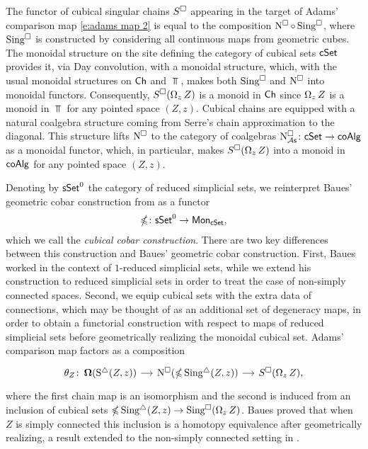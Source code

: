 The functor of cubical singular chains $S^\square$ appearing in the target of Adams' comparison map \eqref{e:adams map 2} is equal to the composition $\operatorname{N^{\square}} \circ \operatorname{Sing^{\square}}$, where $\operatorname{Sing^{\square}}$ is constructed by considering all continuous maps from geometric cubes.
The monoidal structure on the site defining the category of cubical sets $\mathsf{cSet}$ provides it, via Day convolution, with a monoidal structure, which, with the usual monoidal structures on $\mathsf{Ch}$ and $\Top$, makes both $\operatorname{Sing^{\square}}$ and $\operatorname{N^{\square}}$ into monoidal functors.
Consequently, $S^\square(\operatorname{\Omega}_z Z)$ is a monoid in $\mathsf{Ch}$ since $\operatorname{\Omega}_z Z$ is a monoid in $\Top$ for any pointed space $(Z, z)$.
Cubical chains are equipped with a natural coalgebra structure coming from Serre's chain approximation to the diagonal.
This structure lifts $\operatorname{N^{\square}}$ to the category of coalgebras $\operatorname{N^{\square}_{{\mathcal{A}\mathsf{s}}}} \colon \mathsf{cSet} \to \mathsf{coAlg}$ as a monoidal functor, which, in particular, makes $S^\square(\operatorname{\Omega}_z Z)$ into a monoid in $\mathsf{coAlg}$ for any pointed space $(Z, z)$.

Denoting by $\mathsf{sSet}^0$ the category of reduced simplicial sets, we reinterpret Baues' geometric cobar construction from \cite{baues1998hopf} as a functor
\[
\operatorname{\mathbb{\Omega}} \colon \mathsf{sSet}^0 \to \mathsf{Mon}_{\mathsf{cSet}},
\]
which we call the \textit{cubical cobar construction}. There are two key differences between this construction and Baues' geometric cobar construction. First, Baues worked in the context of $1$-reduced simplicial sets, while we extend his construction to reduced simplicial sets in order to treat the case of non-simply connected spaces. Second, we equip cubical sets with the extra data of connections, which may be thought of as an additional set of degeneracy maps, in order to obtain a functorial construction with respect to maps of reduced simplicial sets before geometrically realizing the monoidal cubical set. Adams' comparison map factors as a composition
\begin{equation} \label{e:baues factorization of adams map}
\begin{tikzcd}[column sep = small]
\theta_Z \colon \cobar(\sS(Z, z)) \arrow[r] &
\cchains(\ccobar \sSing(Z, z)) \arrow[r] &
S^{\cube}(\loops_z Z),
\end{tikzcd}
\end{equation}
where the first chain map is an isomorphism and the second is induced from an inclusion of cubical sets $\operatorname{\mathbb{\Omega}} \operatorname{Sing^{\triangle}}(Z, z) \to \operatorname{Sing^{\square}}(\operatorname{\Omega}_z Z)$.
Baues proved that when $Z$ is simply connected this inclusion is a homotopy equivalence after geometrically realizing, a result extended to the non-simply connected setting in \cite{rivera2019path}. 

